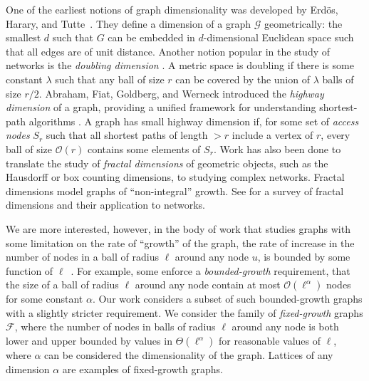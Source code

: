 One of the earliest notions of graph dimensionality was developed by 
Erd{\"o}s,
Harary, and Tutte~\cite{Erdos_Harary_Tutte_1965}.
They define a dimension of a graph $\mathcal{G}$ geometrically: the smallest
$d$ such that $G$ can be embedded in $d$-dimensional Euclidean space such that
all edges are of unit distance.
Another notion popular in the study of networks is the \emph{doubling dimension}
\cite{gupta2003bounded,abraham2006routing,cole2006searching,konjevod2008dynamic,chan2016hierarchical,konjevod2007compact}.
A metric space is doubling if there is some constant $\lambda$ such that any
ball of size $r$ can be covered by the union of $\lambda$ balls of size $r/2$.
Abraham, Fiat, Goldberg, and Werneck introduced the \emph{highway dimension} of
a graph, providing a unified framework for understanding shortest-path
algorithms \cite{abrahamhighway}.
A graph has small highway dimension if, for some set of {\it access nodes} $S_r$
such that all shortest paths of length $> r$ include a vertex of $r$, every ball
of size $\mathcal{O}(r)$ contains some elements of $S_r$.
Work has also been done to translate the study of \emph{fractal dimensions} of
geometric objects, such as the Hausdorff or box counting dimensions, to studying
complex networks.
Fractal dimensions model graphs of ``non-integral''
growth. See \cite{rosenbergsurvey} for a survey of fractal dimensions and their
application to networks.

We are more interested, however, in the body of work that studies graphs with
some limitation on the rate of ``growth'' of the graph,
the rate of increase in the number of nodes in a ball of radius $\ell$ around any
node $u$, is bounded by some function of
$\ell$~\cite{stefanExpansion,johannesExpansion,kargerExpansion,ittai2005name,kuhn2005locality,krauthgamer2003intrinsic,BARTAL2005192,gfeller2007randomized}.
For example, some enforce a \emph{bounded-growth} requirement, that
the size of a ball of radius $\ell$ around any node contain at most
$\mathcal{O}(\ell^\alpha)$ nodes for some constant $\alpha$.
Our work considers a subset of such bounded-growth graphs with a slightly stricter requirement.
We consider the family of \emph{fixed-growth} graphs 
$\mathcal{F}$, where the number of
nodes in balls of radius $\ell$ around any node is both lower and upper bounded
by values in  $\Theta(\ell^\alpha)$ for reasonable values of $\ell$, where
$\alpha$ can be considered the dimensionality of the graph. 
Lattices of any dimension $\alpha$ are examples of fixed-growth graphs.

